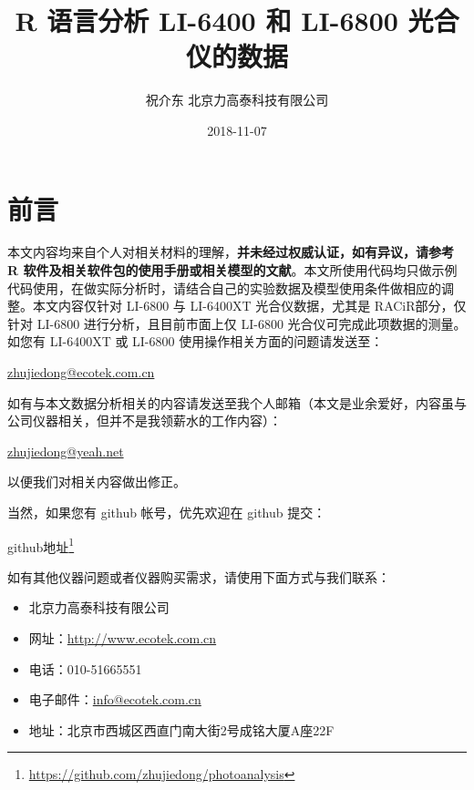 \documentclass[]{krantz}
\title{R 语言分析 LI-6400 和 LI-6800 光合仪的数据}
\author{祝介东 北京力高泰科技有限公司}
\date{2018-11-07}
\renewcommand{\href}[2]{#2\footnote{\url{#1}}}
\theoremstyle{definition}
\theoremstyle{definition}
\theoremstyle{definition}
\theoremstyle{remark}
\begin{document}
\maketitle



\thispagestyle{empty}

\setlength{\abovedisplayskip}{-5pt}
\setlength{\abovedisplayshortskip}{-5pt}

{
\hypersetup{linkcolor=black}
\setcounter{tocdepth}{2}
\tableofcontents
}
\listoftables
\listoffigures
\frontmatter

\chapter*{前言}


本文内容均来自个人对相关材料的理解，\textbf{并未经过权威认证，如有异议，请参考
R
软件及相关软件包的使用手册或相关模型的文献}。本文所使用代码均只做示例代码使用，在做实际分析时，请结合自己的实验数据及模型使用条件做相应的调整。本文内容仅针对
LI-6800 与 LI-6400XT 光合仪数据，尤其是 RACiR\texttrademark 部分，仅针对
LI-6800 进行分析，且目前市面上仅 LI-6800
光合仪可完成此项数据的测量。如您有 LI-6400XT 或 LI-6800
使用操作相关方面的问题请发送至：

\url{zhujiedong@ecotek.com.cn}

如有与本文数据分析相关的内容请发送至我个人邮箱（本文是业余爱好，内容虽与公司仪器相关，但并不是我领薪水的工作内容）：

\url{zhujiedong@yeah.net}

以便我们对相关内容做出修正。

当然，如果您有 github 帐号，优先欢迎在 github 提交：

\href{https://github.com/zhujiedong/photoanalysis}{github地址}

如有其他仪器问题或者仪器购买需求，请使用下面方式与我们联系：

\begin{itemize}
\item
  北京力高泰科技有限公司
\item
  网址：\url{http://www.ecotek.com.cn}
\item
  电话：010-51665551
\item
  电子邮件：\url{info@ecotek.com.cn}
\item
  地址：北京市西城区西直门南大街2号成铭大厦A座22F
\end{itemize}
\end{document}
